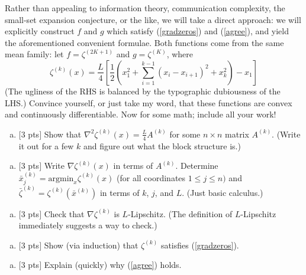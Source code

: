 \documentclass[12pt]{article}
\begin{document}
Rather than appealing to information theory, communication complexity, the small-set expansion conjecture, or the like, we will take a direct approach: we will explicitly construct $f$ and $g$ which satisfy (\ref{gradzeros}) and (\ref{agree}), and yield the aforementioned convenient formulae. Both functions come from the same mean family: let $f = \zeta^{(2K+1)}$ and $g = \zeta^{(K)}$, where
$$\zeta^{(k)}(x) = \frac{L}{4} \left[\frac{1}{2}\left( x_1^2 + \sum_{i=1}^{k-1}(x_i - x_{i+1})^2 + x_k^2\right) - x_1\right]$$
(The ugliness of the RHS is balanced by the typographic dubiousness of the LHS.) Convince yourself, or just take my word, that these functions are convex and continuously differentiable. Now for some math; include all your work!
\begin{enumerate}[(b)]
 \item $[$3 pts$]$ Show that $\nabla^2 \zeta^{(k)}(x) = \frac{L}{4}A^{(k)}$ for some $n \times n$ matrix $A^{(k)}$. (Write it out for a few $k$ and figure out what the block structure is.)
 \end{enumerate}
 \vspace{.25cm}
 
\begin{enumerate}[(c)]
 \item $[$3 pts$]$ Write $\nabla \zeta^{(k)}(x)$ in terms of $A^{(k)}$. Determine $\bar{x}^{(k)}_j = \textrm{argmin}_x \zeta^{(k)}(x)$ (for all coordinates $1 \leq j \leq n)$ and $\bar{\zeta}^{(k)} = \zeta^{(k)}(\bar{x}^{(k)})$ in terms of $k$, $j$, and $L$. (Just basic calculus.)
 \end{enumerate}
 \vspace{.25cm}
 
\begin{enumerate}[(d)]
 \item $[$3 pts$]$ Check that $\nabla \zeta^{(k)}$ is $L$-Lipschitz. (The definition of $L$-Lipschitz immediately suggests a way to check.)
  \end{enumerate}
 \vspace{.25cm}
 
 \begin{enumerate}[(e)]
 \item $[$3 pts$]$ Show (via induction) that $\zeta^{(k)}$ satisfies (\ref{gradzeros}).
 \end{enumerate}
 \vspace{.25cm}
  
 \begin{enumerate}[(f)]
 \item $[$3 pts$]$ Explain (quickly) why (\ref{agree}) holds.
  \end{enumerate}
 \vspace{.25cm}
 
\end{document}
